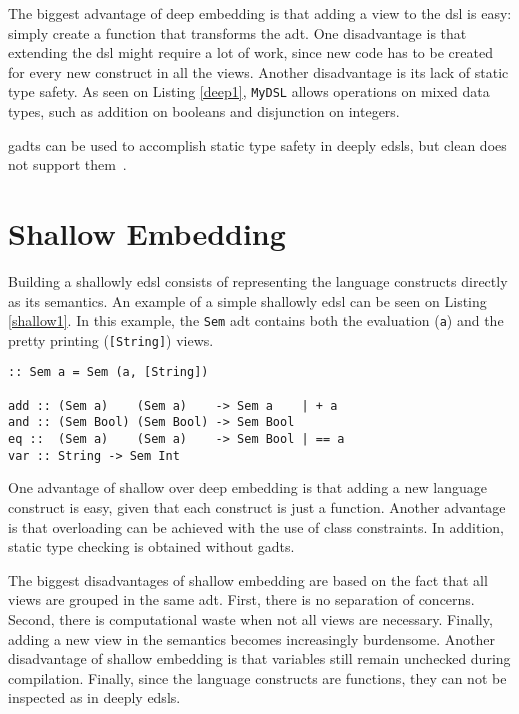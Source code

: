 The biggest advantage of deep embedding is that adding a view to the \ac{dsl} is easy: simply create a function that transforms the \ac{adt}. One disadvantage is that extending the \ac{dsl} might require a lot of work, since new code has to be created for every new construct in all the views. Another disadvantage is its lack of static type safety. As seen on Listing \ref{deep1}, \texttt{MyDSL} allows operations on mixed data types, such as addition on booleans and disjunction on integers. 

\acp{gadt} can be used to accomplish static type safety in deeply \acp{edsl}, but \gls{clean} does not support them~\cite{gadts}. 

\section{Shallow Embedding}
Building a shallowly \ac{edsl} consists of representing the language constructs directly as its semantics. An example of a simple shallowly \ac{edsl} can be seen on Listing \ref{shallow1}. In this example, the \texttt{Sem} \ac{adt} contains both the evaluation (\texttt{a}) and the pretty printing (\texttt{[String]}) views.

\begin{lstlisting}[caption=A simple shallowly \ac{edsl},captionpos=b,label=shallow1]
:: Sem a = Sem (a, [String])

add :: (Sem a)    (Sem a)    -> Sem a    | + a
and :: (Sem Bool) (Sem Bool) -> Sem Bool
eq ::  (Sem a)    (Sem a)    -> Sem Bool | == a
var :: String -> Sem Int
\end{lstlisting}

One advantage of shallow over deep embedding is that adding a new language construct is easy, given that each construct is just a function. Another advantage is that overloading can be achieved with the use of class constraints. In addition, static type checking is obtained without \acp{gadt}. 

The biggest disadvantages of shallow embedding are based on the fact that all views are grouped in the same \ac{adt}. First, there is no separation of concerns. Second, there is computational waste when not all views are necessary. Finally, adding a new view in the semantics becomes increasingly burdensome. Another disadvantage of shallow embedding is that variables still remain unchecked during compilation. Finally, since the language constructs are functions, they can not be inspected as in deeply \acp{edsl}.

